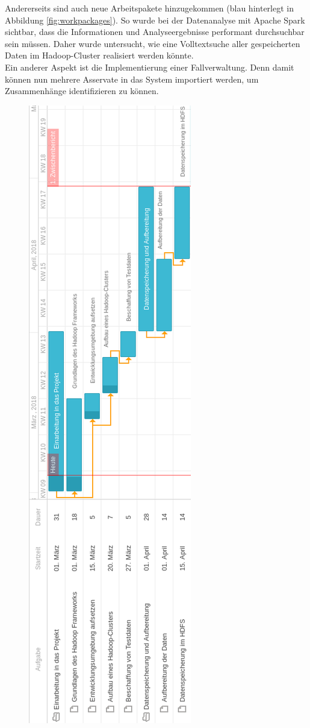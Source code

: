 \noindent
Andererseits sind auch neue Arbeitspakete hinzugekommen (blau hinterlegt in Abbildung \ref{fig:workpackages}). So wurde bei der Datenanalyse mit Apache Spark sichtbar, dass die Informationen und Analyseergebnisse performant durchsuchbar sein müssen. Daher wurde untersucht, wie eine Volltextsuche aller gespeicherten Daten im Hadoop-Cluster realisiert werden könnte.\\
Ein anderer Aspekt ist die Implementierung einer Fallverwaltung. Denn damit können nun mehrere Asservate in das System importiert werden, um Zusammenhänge identifizieren zu können. 

\begin{figure}[p]
  \centering
  \includegraphics[width=\textwidth,height=\textheight,keepaspectratio]{./resource/ganttA.png}

\end{figure}
